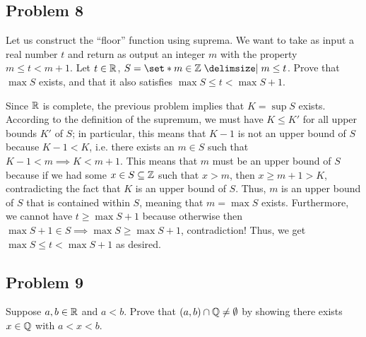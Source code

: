 \documentclass[main.tex]{subfiles}
\begin{document}
\subsection{Problem 8}
\begin{claim}
    Let us construct the “floor” function using suprema. We want to take as input a real number $t$ and return as output an integer $m$ with the property $m \le t < m + 1$. Let $t \in \mathbb R$, $S = \set*{m \in \ZZ \mid m \le t}$. Prove that $\max S$ exists, and that it also satisfies $\max S \le t < \max S + 1$.
\end{claim}

\begin{soln}
    Since $\mathbb R$ is complete, the previous problem implies that $K = \sup S$ exists. According to the definition of the supremum, we must have $K\le K'$ for all upper bounds $K'$ of $S$; in particular, this means that $K - 1$ is not an upper bound of $S$ because $K - 1 < K$, i.e. there exists an $m\in S$ such that $K - 1 < m \implies K < m + 1$. This means that $m$ must be an upper bound of $S$ because if we had some $x\in S\subseteq \mathbb Z$ such that $x > m$, then $x \ge m + 1 > K$, contradicting the fact that $K$ is an upper bound of $S$. Thus, $m$ is an upper bound of $S$ that is contained within $S$, meaning that $m = \max S$ exists. Furthermore, we cannot have $t \ge \max S + 1$ because otherwise then $\max S + 1\in S\implies \max S\ge \max S + 1$, contradiction! Thus, we get $\max S \le t < \max S + 1$ as desired.
\end{soln}
\eject

\subsection{Problem 9}
\begin{claim}
    Suppose $a, b \in \mathbb R$ and $a < b$. Prove that $(a,b) \cap \mathbb Q \neq \emptyset$ by showing there exists $x \in \mathbb Q$ with $a < x < b$.
\end{claim}
\end{document}
